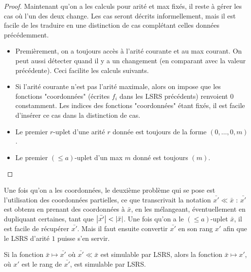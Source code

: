 \documentclass{report}
\newcommand{\leqa}{\left( \leqslant a \right)}
\begin{document}
\begin{proof}
			
			Maintenant qu'on a les calculs pour arité et max fixés, il reste à gérer les cas où l'un des deux change. Les cas seront décrits informellement, mais il est facile de les traduire en une distinction de cas complétant celles données précédemment.
			
			\begin{itemize}[itemsep=-1mm]
				\item 	Premièrement, on a toujours accès à l'arité courante et au max courant. On peut aussi détecter quand il y a un changement (en comparant avec la valeur précédente). Ceci facilite les calculs suivants.
				
				\item 	Si l'arité courante n'est pas l'arité maximale, alors on impose que les fonctions "coordonnées" (écrites $f_i$ dans les LSRS précédents) renvoient $0$ constamment. Les indices des fonctions "coordonnées" étant fixés, il est facile d'insérer ce cas dans la distinction de cas. 
				
				\item 	Le premier $r$-uplet d'une arité $r$ donnée est toujours de la forme $\left(0, \dots, 0, m\right)$. 
				
				\item 	Le premier $\leqa$-uplet d'un max $m$ donné est toujours $(m)$. 
			\end{itemize}
		
		
		
	\end{proof}
	
	Une fois qu'on a les coordonnées, le deuxième problème qui se pose est l'utilisation des coordonnées partielles, ce que transcrivait la notation $\bar{x'} \ll \bar{x}$ : $\bar{x'}$ est obtenu en prenant des coordonnées à $\bar{x}$, en les mélangeant, éventuellement en dupliquant certaines, tant que $\left|\bar{x'}\right| < \left|\bar{x}\right|$. Une fois qu'on a le $\leqa$-uplet $\bar{x}$, il est facile de récupérer $\bar{x'}$. Mais il faut ensuite convertir $\bar{x'}$ en son rang $x'$ afin que le LSRS d'arité $1$ puisse s'en servir. 
	
	\begin{lemma}
		\label{lem:sub_uplet_simulable}
		Si la fonction $\bar{x} \mapsto \bar{x'}$ où $\bar{x'} \ll \bar{x}$ est simulable par LSRS, alors la fonction $\bar{x} \mapsto x'$, où $x'$ est le rang de $\bar{x'}$, est simulable par LSRS.
	\end{lemma}
	
\end{document}
